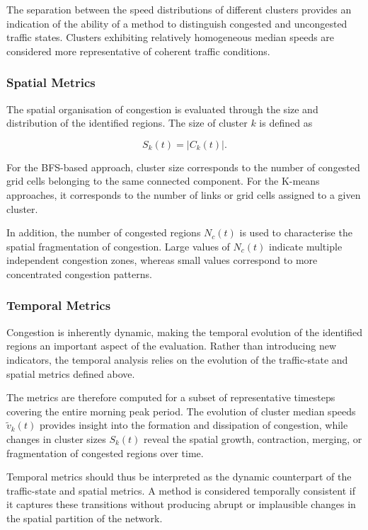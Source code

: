 \documentclass[11pt,a4paper]{article}
\begin{document}
The separation between the speed distributions of different clusters provides
an indication of the ability of a method to distinguish congested and
uncongested traffic states. Clusters exhibiting relatively homogeneous median
speeds are considered more representative of coherent traffic conditions.

\subsubsection{Spatial Metrics}

The spatial organisation of congestion is evaluated through the size and
distribution of the identified regions. The size of cluster $k$ is defined as

\begin{equation}
S_k(t) = |C_k(t)|.
\end{equation}

For the BFS-based approach, cluster size corresponds to the number of
congested grid cells belonging to the same connected component. For the
K-means approaches, it corresponds to the number of links or grid cells
assigned to a given cluster.

In addition, the number of congested regions $N_c(t)$ is used to characterise
the spatial fragmentation of congestion. Large values of $N_c(t)$ indicate
multiple independent congestion zones, whereas small values correspond to
more concentrated congestion patterns.

\subsubsection{Temporal Metrics}

Congestion is inherently dynamic, making the temporal evolution of the
identified regions an important aspect of the evaluation. Rather than
introducing new indicators, the temporal analysis relies on the evolution of
the traffic-state and spatial metrics defined above.

The metrics are therefore computed for a subset of representative timesteps
covering the entire morning peak period. The evolution of cluster median
speeds $\tilde{v}_k(t)$ provides insight into the formation and dissipation of
congestion, while changes in cluster sizes $S_k(t)$ reveal the spatial growth,
contraction, merging, or fragmentation of congested regions over time.

Temporal metrics should thus be interpreted as the dynamic counterpart of the
traffic-state and spatial metrics. A method is considered temporally
consistent if it captures these transitions without producing abrupt or
implausible changes in the spatial partition of the network.
\end{document}
